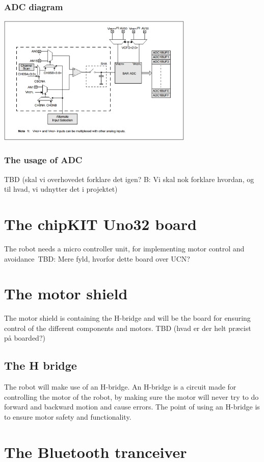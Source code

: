 \subsubsection{ADC diagram} 

\includegraphics[width=0.7\textwidth]{figures/adcblock.PNG}


\subsubsection{The usage of ADC}
TBD (skal vi overhovedet forklare det igen? B: Vi skal nok forklare hvordan, og til hvad, vi udnytter det i projektet)
\section{The chipKIT Uno32 board}
The robot needs a micro controller unit, for implementing motor control and avoidance\
TBD: Mere fyld, hvorfor dette board over UCN?

\section{The motor shield}
The motor shield is containing the H-bridge and will be the board for ensuring control of the different components and motors.
TBD (hvad er der helt præcist på boarded?)

\subsection{The H bridge}
The robot will make use of an H-bridge. An H-bridge is a circuit made for controlling the motor of the robot, by making sure the motor will never try to do forward and backward motion  and cause errors. The point of using an H-bridge is to ensure motor safety and functionality.

\section{The Bluetooth tranceiver}

